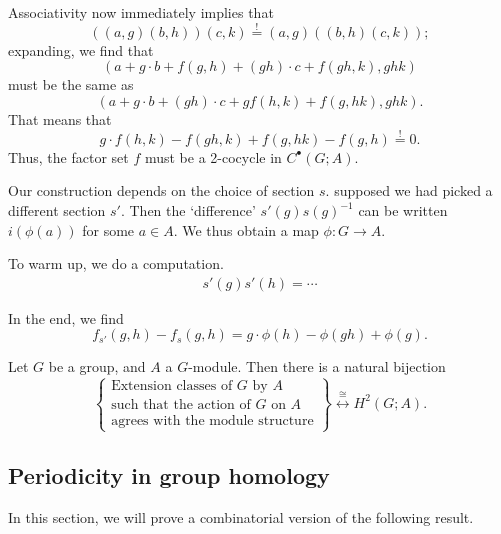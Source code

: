 \documentclass[main.tex]{subfiles}
\begin{document}
Associativity now immediately implies that
\begin{equation*}
  ((a, g)(b, h))(c, k) \overset{!}{=} (a, g)((b, h)(c, k));
\end{equation*}
expanding, we find that
\begin{equation*}
  (a + g\cdot b + f(g, h) + (gh)\cdot c + f(gh, k), ghk)
\end{equation*}
must be the same as
\begin{equation*}
  (a + g\cdot b + (gh)\cdot c + g f(h, k) + f(g, hk), ghk).
\end{equation*}
That means that
\begin{equation*}
  g\cdot f(h, k) - f(gh, k) + f(g, hk) - f(g, h) \overset{!}{=} 0.
\end{equation*}
Thus, the factor set $f$ must be a 2-cocycle in $C^{\bullet}(G; A)$.

Our construction depends on the choice of section $s$. supposed we had picked a different section $s'$. Then the `difference' $s'(g)s(g)^{-1}$ can be written $i(\phi(a))$ for some $a \in A$. We thus obtain a map $\phi\colon G \to A$.

To warm up, we do a computation.
\begin{align*}
  s'(g)s'(h) = \cdots
\end{align*}

In the end, we find
\begin{equation*}
  f_{s'}(g, h) - f_{s}(g, h) = g\cdot \phi(h) - \phi(gh) + \phi(g).
\end{equation*}

\begin{theorem}
  Let $G$ be a group, and $A$ a $G$-module. Then there is a natural bijection
  \begin{equation*}
    \left\{ 
      \substack{\text{Extension classes of $G$ by $A$} \\ \text{such that the action of $G$ on $A$} \\ \text{agrees with the module structure}}
    \right\}
    \overset{\cong}{\longleftrightarrow}
    H^{2}(G; A).
  \end{equation*}
\end{theorem}

\subsection{Periodicity in group homology}
\label{ssc:periodicity_in_group_homology}

In this section, we will prove a combinatorial version of the following result.
\end{document}
